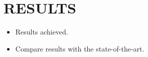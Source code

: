 \chapter{RESULTS}
\label{chapter:method}
\begin{itemize}
\item Results achieved.
\item Compare results with the state-of-the-art.
\end{itemize}
